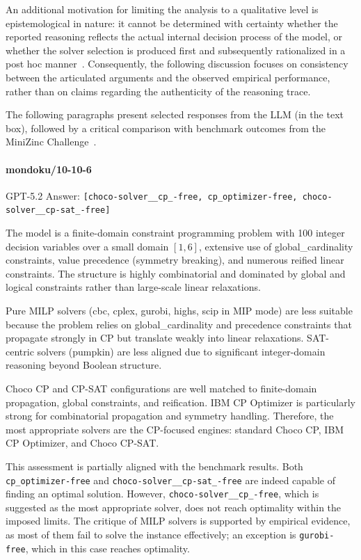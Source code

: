 \documentclass[../../main]{subfiles}
\begin{document}
An additional motivation for limiting the analysis to a qualitative level is epistemological in nature: it cannot be determined with certainty whether the reported reasoning reflects the actual internal decision process of the model, or whether the solver selection is produced first and subsequently rationalized in a post hoc manner~\cite{LLMapprehension}. Consequently, the following discussion focuses on consistency between the articulated arguments and the observed empirical performance, rather than on claims regarding the authenticity of the reasoning trace.

The following paragraphs present selected responses from the LLM (in the text box), followed by a critical comparison with benchmark outcomes from the MiniZinc Challenge~\cite{MznResults25}.

\paragraph{mondoku/10-10-6}
\begin{floatingdefinition}{GPT-5.2 Answer:}
        \texttt{[choco-solver\_\_cp\_-free, cp\_optimizer-free, choco-solver\_\_cp-sat\_-free]}

        The model is a finite-domain constraint programming problem with 100 integer decision variables over a small domain $[1,6]$, extensive use of global\_cardinality constraints, value precedence (symmetry breaking), and numerous reified linear constraints. The structure is highly combinatorial and dominated by global and logical constraints rather than large-scale linear relaxations.

        Pure MILP solvers (cbc, cplex, gurobi, highs, scip in MIP mode) are less suitable because the problem relies on global\_cardinality and precedence constraints that propagate strongly in CP but translate weakly into linear relaxations. SAT-centric solvers (pumpkin) are less aligned due to significant integer-domain reasoning beyond Boolean structure.

        Choco CP and CP-SAT configurations are well matched to finite-domain propagation, global constraints, and reification. IBM CP Optimizer is particularly strong for combinatorial propagation and symmetry handling. Therefore, the most appropriate solvers are the CP-focused engines: standard Choco CP, IBM CP Optimizer, and Choco CP-SAT.
\end{floatingdefinition}

This assessment is partially aligned with the benchmark results. Both \texttt{cp\_optimizer-free} and \texttt{choco-solver\_\_cp-sat\_-free} are indeed capable of finding an optimal solution. However, \texttt{choco-solver\_\_cp\_-free}, which is suggested as the most appropriate solver, does not reach optimality within the imposed limits. The critique of MILP solvers is supported by empirical evidence, as most of them fail to solve the instance effectively; an exception is \texttt{gurobi-free}, which in this case reaches optimality.
\end{document}
